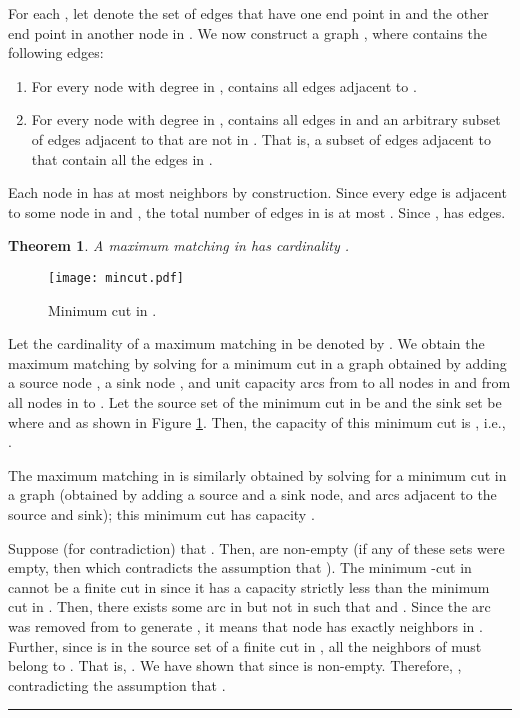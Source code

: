 \documentclass{article}
\newtheorem{theorem}{Theorem}[section]
\newenvironment{proof}[1][Proof:]{\begin{trivlist}
\item[\hskip \labelsep {\bfseries #1}]}{\end{trivlist}}
\newcommand{\qed}{\hfill \rule{2.5mm}{2.5mm}}
\begin{document}
For each , let  denote the set of edges that have one end point in  and the other end point in another node in .  We now construct a graph , where  contains the following edges:
\begin{enumerate}
\item [(i)] For every node  with degree  in ,  contains all edges adjacent to .
\item [(ii)]  For every node  with degree  in ,  contains all edges in  and an arbitrary subset of  edges adjacent to  that are not in . That is, a subset of  edges adjacent to  that contain all the edges in .
\end{enumerate}

\noindent Each node  in  has at most  neighbors by construction. Since every edge is adjacent to some node in  and , the total number of edges in  is at most . Since ,  has  edges.

\begin{theorem}
\label{theorem:altGraphMatching}
A maximum matching in  has cardinality .
\end{theorem}
\begin{proof}

\begin{figure}[ht]
\centerline{\texttt{[image: mincut.pdf]}}
\caption{\label{fig:mincut}Minimum cut in .}
\end{figure}

Let the cardinality of a maximum matching in  be denoted by . We obtain the maximum matching by solving for a minimum cut in a graph  obtained by adding a source node , a sink node , and unit capacity arcs from  to all nodes in  and from all nodes in  to . Let the source set of the minimum cut in be  and the sink set be  where  and  as shown in Figure \ref{fig:mincut}. Then, the capacity of this minimum cut is , i.e., .

The maximum matching in  is similarly obtained by solving for a minimum cut in a graph  (obtained by adding a source and a sink node, and arcs adjacent to the source and sink); this minimum cut has capacity .

Suppose (for contradiction) that . Then,  are non-empty (if any of these sets were empty, then   which contradicts the assumption that ). The minimum -cut  in  cannot be a finite cut in  since it has a capacity strictly less than the minimum cut in . Then, there exists some arc  in  but not in  such that  and . Since the arc  was removed from  to generate , it means that node  has exactly  neighbors in .  Further, since  is in the source set of a finite cut in , all the neighbors of  must belong to . That is, . We have shown that  since  is non-empty. Therefore, , contradicting the assumption that .  \qed
\end{proof}
\end{document}
